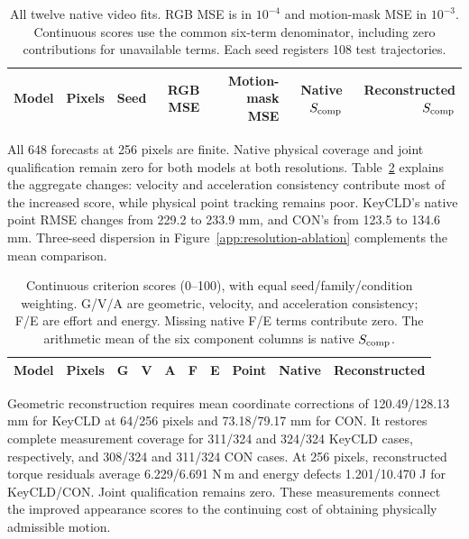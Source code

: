 \documentclass[10pt,twocolumn,letterpaper]{article}
\begin{document}
\begin{table}[t]
\caption{All twelve native video fits. RGB MSE is in $10^{-4}$ and motion-mask MSE in $10^{-3}$. Continuous scores use the common six-term denominator, including zero contributions for unavailable terms. Each seed registers 108 test trajectories.}
\label{app:resolution-seeds}
\centering\small
\begin{tabular}{llrrrrr}
\toprule
Model & Pixels & Seed & RGB MSE & Motion-mask MSE & Native $S_{\rm comp}$ & Reconstructed $S_{\rm comp}$\\
\midrule

\bottomrule
\end{tabular}
\end{table}

All 648 forecasts at 256 pixels are finite. Native physical coverage and joint qualification remain zero for both models at both resolutions. Table~\ref{app:resolution-components} explains the aggregate changes: velocity and acceleration consistency contribute most of the increased score, while physical point tracking remains poor. KeyCLD's native point RMSE changes from 229.2 to 233.9 mm, and CON's from 123.5 to 134.6 mm. Three-seed dispersion in Figure~\ref{app:resolution-ablation} complements the mean comparison.

\begin{table}[t]
\caption{Continuous criterion scores (0--100), with equal seed/family/condition weighting. G/V/A are geometric, velocity, and acceleration consistency; F/E are effort and energy. Missing native F/E terms contribute zero. The arithmetic mean of the six component columns is native $S_{\rm comp}$.}
\label{app:resolution-components}
\centering\small
\begin{tabular}{llrrrrrrrr}
\toprule
Model & Pixels & G & V & A & F & E & Point & Native & Reconstructed\\
\midrule

\bottomrule
\end{tabular}
\end{table}

Geometric reconstruction requires mean coordinate corrections of 120.49/128.13 mm for KeyCLD at 64/256 pixels and 73.18/79.17 mm for CON. It restores complete measurement coverage for 311/324 and 324/324 KeyCLD cases, respectively, and 308/324 and 311/324 CON cases. At 256 pixels, reconstructed torque residuals average 6.229/6.691 N\,m and energy defects 1.201/10.470 J for KeyCLD/CON. Joint qualification remains zero. These measurements connect the improved appearance scores to the continuing cost of obtaining physically admissible motion.
\end{document}
